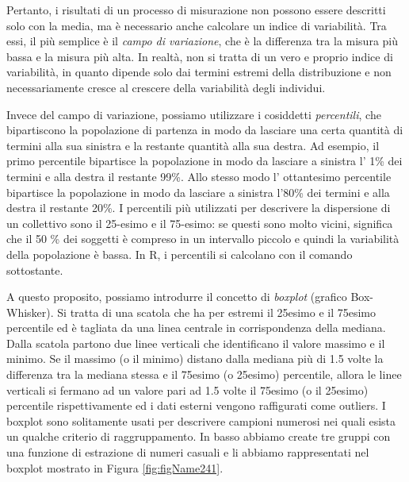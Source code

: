 \documentclass[a4paper,12pt,oneside]{book}
\newenvironment{Shaded}{}{}
\newcommand{\KeywordTok}[1]{#1}
\newcommand{\DataTypeTok}[1]{#1}
\newcommand{\FloatTok}[1]{#1}
\newcommand{\CommentTok}[1]{#1}
\newcommand{\OperatorTok}[1]{#1}
\newcommand{\NormalTok}[1]{#1}
\begin{document}
Pertanto, i risultati di un processo di misurazione non possono essere descritti solo con la media, ma è necessario anche calcolare un indice di variabilità. Tra essi, il più semplice è il \emph{campo di variazione}, che è la differenza tra la misura più bassa e la misura più alta. In realtà, non si tratta di un vero e proprio indice di variabilità, in quanto dipende solo dai termini estremi della distribuzione e non necessariamente cresce al crescere della variabilità degli individui.

Invece del campo di variazione, possiamo utilizzare i cosiddetti \emph{percentili}, che bipartiscono la popolazione di partenza in modo da lasciare una certa quantità di termini alla sua sinistra e la restante quantità alla sua destra. Ad esempio, il primo percentile bipartisce la popolazione in modo da lasciare a sinistra l' 1\% dei termini e alla destra il restante 99\%. Allo stesso modo l' ottantesimo percentile bipartisce la popolazione in modo da lasciare a sinistra l'80\% dei termini e alla destra il restante 20\%. I percentili più utilizzati per descrivere la dispersione di un collettivo sono il 25-esimo e il 75-esimo: se questi sono molto vicini, significa che il 50 \% dei soggetti è compreso in un intervallo piccolo e quindi la variabilità della popolazione è bassa. In R, i percentili si calcolano con il comando sottostante.

\begin{Shaded}
\end{Shaded}

A questo proposito, possiamo introdurre il concetto di \emph{boxplot} (grafico Box-Whisker). Si tratta di una scatola che ha per estremi il 25esimo e il 75esimo percentile ed è tagliata da una linea centrale in corrispondenza della mediana. Dalla scatola partono due linee verticali che identificano il valore massimo e il minimo. Se il massimo (o il minimo) distano dalla mediana più di 1.5 volte la differenza tra la mediana stessa e il 75esimo (o 25esimo) percentile, allora le linee verticali si fermano ad un valore pari ad 1.5 volte il 75esimo (o il 25esimo) percentile rispettivamente ed i dati esterni vengono raffigurati come outliers. I boxplot sono solitamente usati per descrivere campioni numerosi nei quali esista un qualche criterio di raggruppamento. In basso abbiamo create tre gruppi con una funzione di estrazione di numeri casuali e li abbiamo rappresentati nel boxplot mostrato in Figura \ref{fig:figName241}.
\end{document}
